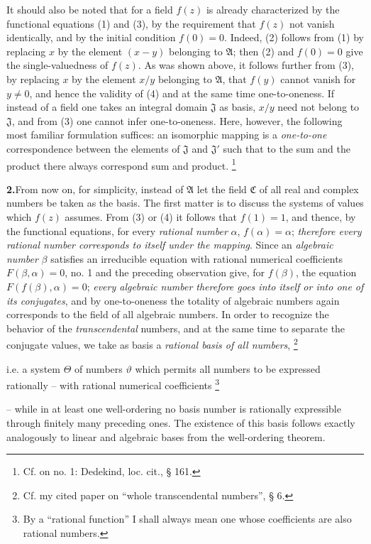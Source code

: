 \documentclass[11pt]{article}
\providecommand{\Afield}{\mathfrak A}
\providecommand{\Cfield}{\mathfrak C}
\providecommand{\Jdom}{\mathfrak{J}}
\providecommand{\srcfn}[2]{%
  \begingroup
  \renewcommand{\thefootnote}{#1}%
  \footnote{#2}%
  \addtocounter{footnote}{-1}%
  \endgroup}
\begin{document}
It should also be noted that for a field \(f(z)\) is already characterized by the functional equations (1) and (3), by the requirement that \(f(z)\) not vanish identically, and by the initial condition \(f(0)=0\). Indeed, (2) follows from (1) by replacing \(x\) by the element \((x-y)\) belonging to \(\Afield\); then (2) and \(f(0)=0\) give the single-valuedness of \(f(z)\). As was shown above, it follows further from (3), by replacing \(x\) by the element \(x/y\) belonging to \(\Afield\), that \(f(y)\) cannot vanish for \(y\ne0\), and hence the validity of (4) and at the same time one-to-oneness. If instead of a field one takes an integral domain \(\Jdom\) as basis, \(x/y\) need not belong to \(\Jdom\), and from (3) one cannot infer one-to-oneness. Here, however, the following most familiar formulation suffices: an isomorphic mapping is a \emph{one-to-one} correspondence between the elements of \(\Jdom\) and \(\Jdom'\) such that to the sum and the product there always correspond sum and product.\srcfn{*)}{Cf. on no. 1: Dedekind, loc. cit., § 161.}

\medskip
\noindent\textbf{2.}\quad From now on, for simplicity, instead of \(\Afield\) let the field \(\Cfield\) of all real and complex numbers be taken as the basis. The first matter is to discuss the systems of values which \(f(z)\) assumes. From (3) or (4) it follows that \(f(1)=1\), and thence, by the functional equations, for every \emph{rational number} \(\alpha\), \(f(\alpha)=\alpha\); \emph{therefore every rational number corresponds to itself under the mapping}. Since an \emph{algebraic number} \(\beta\) satisfies an irreducible equation with rational numerical coefficients \(F(\beta,\alpha)=0\), no. 1 and the preceding observation give, for \(f(\beta)\), the equation \(F(f(\beta),\alpha)=0\); \emph{every algebraic number therefore goes into itself or into one of its conjugates}, and by one-to-oneness the totality of algebraic numbers again corresponds to the field of all algebraic numbers. In order to recognize the behavior of the \emph{transcendental} numbers, and at the same time to separate the conjugate values, we take as basis a \emph{rational basis of all numbers},\srcfn{**)}{Cf. my cited paper on ``whole transcendental numbers'', § 6.} i.e. a system \(\Theta\) of numbers \(\vartheta\) which permits all numbers to be expressed rationally -- with rational numerical coefficients\srcfn{***)}{By a ``rational function'' I shall always mean one whose coefficients are also rational numbers.} -- while in at least one well-ordering no basis number is rationally expressible through finitely many preceding ones. The existence of this basis follows exactly analogously to linear and algebraic bases from the well-ordering theorem.
\end{document}
